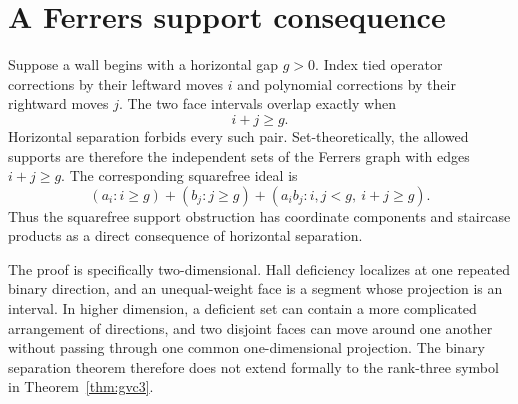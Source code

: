 \documentclass[11pt]{article}
\begin{document}
\section{A Ferrers support consequence}

Suppose a wall begins with a horizontal gap $g>0$.
Index tied operator corrections by their leftward moves $i$ and polynomial
corrections by their rightward moves $j$.  The two face intervals overlap
exactly when
\[
 i+j\geq g.
\]
Horizontal separation forbids every such pair.  Set-theoretically, the
allowed supports are therefore the independent sets of the Ferrers graph
with edges $i+j\geq g$.  The corresponding squarefree ideal is
\[
 (a_i:i\geq g)+(b_j:j\geq g)
 +(a_i b_j:i,j<g,\ i+j\geq g).
\]
Thus the squarefree support obstruction has coordinate components and
staircase products as a direct consequence of horizontal separation.

The proof is specifically two-dimensional.  Hall deficiency localizes at
one repeated binary direction, and an unequal-weight face is a segment
whose projection is an interval.  In higher dimension, a deficient set can
contain a more complicated arrangement of directions, and two disjoint
faces can move around one another without passing through one common
one-dimensional projection.  The binary separation theorem therefore does
not extend formally to the rank-three symbol in
Theorem~\ref{thm:gvc3}.
\end{document}
